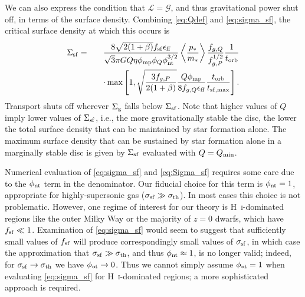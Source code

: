\documentclass[useAMS,usenatbib]{mn2e}
\newcommand{\calL}{\mathcal{L}}
\newcommand{\calG}{\mathcal{G}}
\newcommand{\Qmin}{Q_{\rm min}}
\begin{document}
We can also express the condition that $\calL = \calG$, and thus gravitational power shut off, in terms of the surface density. Combining \autoref{eq:Qdef} and \autoref{eq:sigma_sf}, the critical surface density at which this occurs is
\begin{eqnarray}
\label{eq:Sigma_sf}
\Sigma_{\rm sf}  & = & 
\frac{8\sqrt{2(1+\beta)} f_{\rm sf} \epsilon_{\rm ff}}{\sqrt{3} \pi G Q \eta \phi_{\rm mp} \phi_Q \phi_{\rm nt}^{3/2}} \left\langle\frac{p_*}{m_*}\right\rangle \frac{f_{g,Q}}{f_{g,P}^{1/2}} \frac{1}{t_{\rm orb}}
\nonumber \\
& &
\quad \cdot {} \max\left[1, \sqrt{\frac{3 f_{g,P}}{2(1+\beta)}} \frac{Q \phi_{\rm mp}}{8 f_{g,Q} \epsilon_{\rm ff}} \frac{t_{\rm orb}}{t_{\rm sf,max}}\right].
\end{eqnarray}
Transport shuts off wherever $\Sigma_{\rm g}$ falls below $\Sigma_{\rm sf}$. Note that higher values of $Q$ imply lower values of $\Sigma_{\rm sf}$, i.e., the more gravitationally stable the disc, the lower the total surface density that can be maintained by star formation alone. The maximum surface density that can be sustained by star formation alone in a marginally stable disc is given by $\Sigma_{\rm sf}$ evaluated with $Q = \Qmin$.

Numerical evaluation of \autoref{eq:sigma_sf} and \autoref{eq:Sigma_sf} requires some care due to the $\phi_{\rm nt}$ term in the denominator. Our fiducial choice for this term is $\phi_{\rm nt} = 1$, appropriate for highly-supersonic gas ($\sigma_{\rm sf} \gg \sigma_{\rm th}$). In most cases this choice is not problematic. However, one regime of interest for our theory is  H~\textsc{i}-dominated regions like the outer Milky Way or the majority of $z=0$ dwarfs, which have $f_{\rm sf} \ll 1$. Examination of \autoref{eq:sigma_sf} would seem to suggest that sufficiently small values of $f_{\rm sf}$ will produce correspondingly small values of $\sigma_{\rm sf}$, in which case the approximation that $\sigma_{\rm sf} \gg \sigma_{\rm th}$, and thus $\phi_{\rm nt} \approx 1$, is no longer valid; indeed, for $\sigma_{\rm sf} \rightarrow \sigma_{\rm th}$ we have $\phi_{\rm nt} \rightarrow 0$. Thus we cannot simply assume $\phi_{\rm nt} = 1$ when evaluating \autoref{eq:sigma_sf} for H~\textsc{i}-dominated regions; a more sophisticated approach is required.
\end{document}
